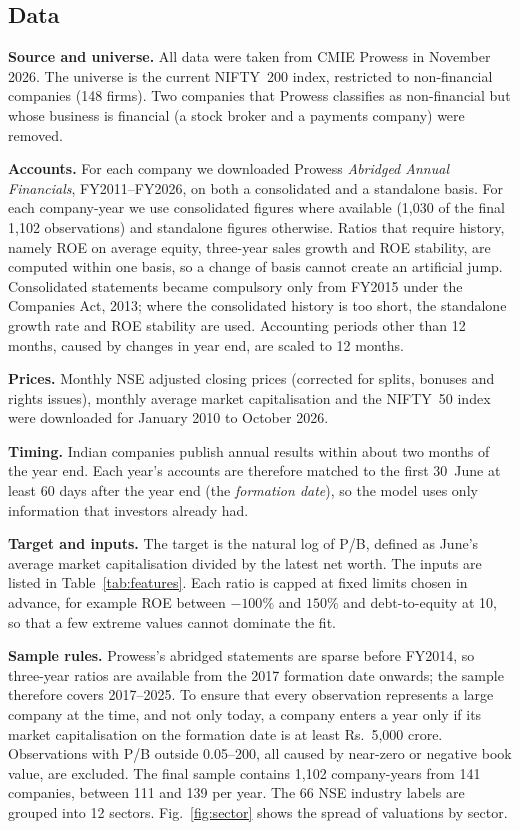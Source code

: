 \documentclass[conference]{IEEEtran}
\begin{document}
\subsection{Data}
\textbf{Source and universe.} All data were taken from CMIE Prowess in November 2026. The universe is the current NIFTY~200 index, restricted to non-financial companies (148 firms). Two companies that Prowess classifies as non-financial but whose business is financial (a stock broker and a payments company) were removed.

\textbf{Accounts.} For each company we downloaded Prowess \emph{Abridged Annual Financials}, FY2011--FY2026, on both a consolidated and a standalone basis. For each company-year we use consolidated figures where available (1,030 of the final 1,102 observations) and standalone figures otherwise. Ratios that require history, namely ROE on average equity, three-year sales growth and ROE stability, are computed within one basis, so a change of basis cannot create an artificial jump. Consolidated statements became compulsory only from FY2015 under the Companies Act, 2013; where the consolidated history is too short, the standalone growth rate and ROE stability are used. Accounting periods other than 12 months, caused by changes in year end, are scaled to 12 months.

\textbf{Prices.} Monthly NSE adjusted closing prices (corrected for splits, bonuses and rights issues), monthly average market capitalisation and the NIFTY~50 index were downloaded for January 2010 to October 2026.

\textbf{Timing.} Indian companies publish annual results within about two months of the year end. Each year's accounts are therefore matched to the first 30~June at least 60 days after the year end (the \emph{formation date}), so the model uses only information that investors already had.

\textbf{Target and inputs.} The target is the natural log of P/B, defined as June's average market capitalisation divided by the latest net worth. The inputs are listed in Table~\ref{tab:features}. Each ratio is capped at fixed limits chosen in advance, for example ROE between $-100\%$ and $150\%$ and debt-to-equity at 10, so that a few extreme values cannot dominate the fit.

\textbf{Sample rules.} Prowess's abridged statements are sparse before FY2014, so three-year ratios are available from the 2017 formation date onwards; the sample therefore covers 2017--2025. To ensure that every observation represents a large company at the time, and not only today, a company enters a year only if its market capitalisation on the formation date is at least Rs.~5,000 crore. Observations with P/B outside 0.05--200, all caused by near-zero or negative book value, are excluded. The final sample contains 1,102 company-years from 141 companies, between 111 and 139 per year. The 66 NSE industry labels are grouped into 12 sectors. Fig.~\ref{fig:sector} shows the spread of valuations by sector.
\end{document}
